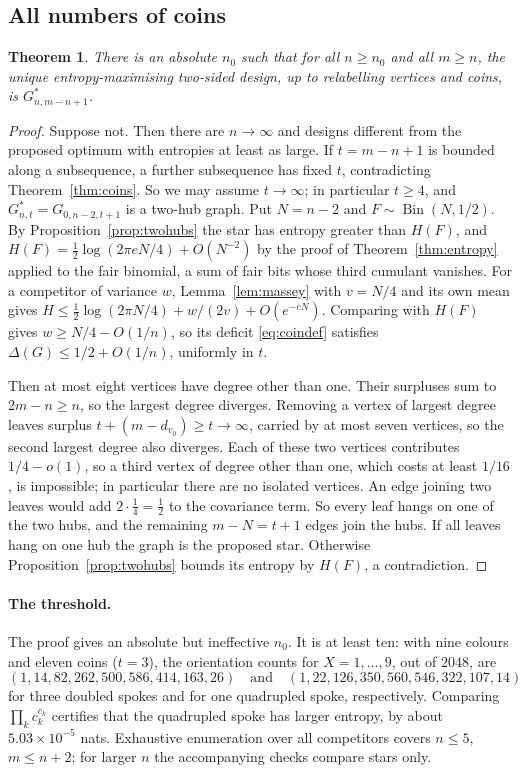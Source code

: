 \documentclass[11pt,a4paper]{article}
\newtheorem{theorem}{Theorem}[section]\newtheorem{lemma}[theorem]{Lemma}\newtheorem{proposition}[theorem]{Proposition}\newtheorem{corollary}[theorem]{Corollary}
\theoremstyle{definition}\newtheorem{remark}[theorem]{Remark}\newtheorem{conjecture}{Conjecture}
\begin{document}
\subsection{All numbers of coins}
\begin{theorem}\label{thm:uniformcoins}
There is an absolute $n_0$ such that for all $n\ge n_0$ and all $m\ge n$, the unique entropy-maximising two-sided design, up to relabelling vertices and coins, is $G_{n,m-n+1}^*$.
\end{theorem}
\begin{proof}
Suppose not. Then there are $n\to\infty$ and designs different from the proposed optimum with entropies at least as large. If $t=m-n+1$ is bounded along a subsequence, a further subsequence has fixed $t$, contradicting Theorem~\ref{thm:coins}. So we may assume $t\to\infty$; in particular $t\ge4$, and $G^*_{n,t}=G_{0,n-2,t+1}$ is a two-hub graph. Put $N=n-2$ and $F\sim\operatorname{Bin}(N,1/2)$. By Proposition~\ref{prop:twohubs} the star has entropy greater than $H(F)$, and $H(F)=\tfrac12\log(2\pi eN/4)+O(N^{-2})$ by the proof of Theorem~\ref{thm:entropy} applied to the fair binomial, a sum of fair bits whose third cumulant vanishes. For a competitor of variance $w$, Lemma~\ref{lem:massey} with $v=N/4$ and its own mean gives $H\le\tfrac12\log(2\pi N/4)+w/(2v)+O(e^{-cN})$. Comparing with $H(F)$ gives $w\ge N/4-O(1/n)$, so its deficit \eqref{eq:coindef} satisfies $\Delta(G)\le1/2+O(1/n)$, uniformly in $t$.

Then at most eight vertices have degree other than one. Their surpluses sum to $2m-n\ge n$, so the largest degree diverges. Removing a vertex of largest degree leaves surplus $t+(m-d_{v_0})\ge t\to\infty$, carried by at most seven vertices, so the second largest degree also diverges. Each of these two vertices contributes $1/4-o(1)$, so a third vertex of degree other than one, which costs at least $1/16$, is impossible; in particular there are no isolated vertices. An edge joining two leaves would add $2\cdot\tfrac14=\tfrac12$ to the covariance term. So every leaf hangs on one of the two hubs, and the remaining $m-N=t+1$ edges join the hubs. If all leaves hang on one hub the graph is the proposed star. Otherwise Proposition~\ref{prop:twohubs} bounds its entropy by $H(F)$, a contradiction.
\end{proof}

\paragraph{The threshold.} The proof gives an absolute but ineffective $n_0$. It is at least ten: with nine colours and eleven coins ($t=3$), the orientation counts for $X=1,\ldots,9$, out of $2048$, are
\[(1,14,82,262,500,586,414,163,26)\quad\text{and}\quad(1,22,126,350,560,546,322,107,14)\]
for three doubled spokes and for one quadrupled spoke, respectively. Comparing $\prod_kc_k^{c_k}$ certifies that the quadrupled spoke has larger entropy, by about $5.03\times10^{-5}$ nats. Exhaustive enumeration over all competitors covers $n\le5$, $m\le n+2$; for larger $n$ the accompanying checks compare stars only.
\end{document}
